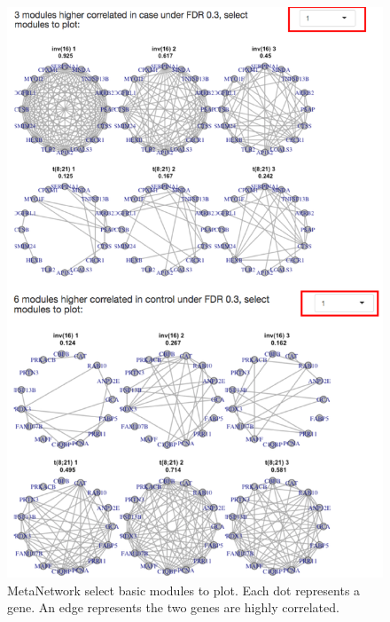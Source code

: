 \begin{figure}[H]
\begin{center}
\includegraphics[scale=0.7]{./figure/MetaNetwork/MetaNetworkBMplot.png}
\caption{MetaNetwork select basic modules to plot.
Each dot represents a gene.
An edge represents the two genes are highly correlated.}
\label{fig:MetaNetworkBMplot}
\end{center}
\end{figure}
